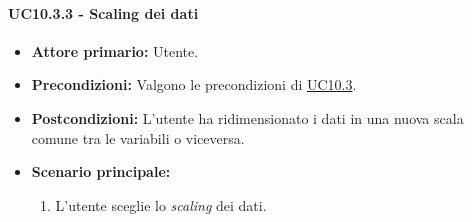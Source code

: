 \paragraph{UC10.3.3 - Scaling dei dati}
\label{sec:UC10.3.3}
    \begin{itemize}
        \item \textbf{Attore primario:} Utente.
        \item \textbf{Precondizioni:} Valgono le precondizioni di \hyperref[sec:UC10.3]{UC10.3}.
	    \item \textbf{Postcondizioni:} L'utente ha ridimensionato i dati in una nuova scala comune tra le variabili o viceversa.
	    \item \textbf{Scenario principale:} 
	    \begin{enumerate}
	    		\item L'utente sceglie lo \textit{scaling} dei dati.
		\end{enumerate}
    \end{itemize}

\newpage

